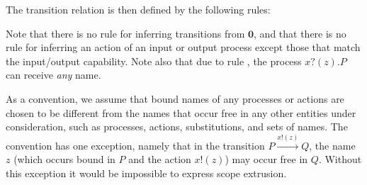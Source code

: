\documentclass[a4paper]{article}
\newcommand{\Pend}{\bm{0}}
\newcommand{\Ppar}[2]{#1 \mid #2}
\newcommand{\Pres}[2]{(\bm{\nu} #1)~#2}
\newcommand{\Pout}[3]{#1 ! #2 . #3}
\newcommand{\Pin}[3]{#1 ? (#2) . #3}
\newcommand{\Pchoice}[2]{#1 + #2}
\newcommand{\freenames}[1]{\textrm{fn}(#1)}
\newcommand{\boundnames}[1]{\textrm{bn}(#1)}
\newcommand{\names}[1]{\textrm{n}(#1)}
\newcommand{\subst}[3]{#1\{#2/#3\}}
\newcommand{\Aoutf}[2]{#1 ! #2}
\newcommand{\Aoutb}[2]{#1 ! (#2)}
\newcommand{\Ain}[2]{#1 ? #2}
\newcommand{\Atau}{\tau}
\newcommand{\transition}[3]{#1 \xrightarrow{#2} #3}
\begin{document}
The transition relation is then defined by the following rules:
Note that there is no rule for inferring transitions from \( \Pend \), and that there is no rule for inferring an action of an input or output process except those that match the input/output capability.
Note also that due to rule , the process \( \Pin{x}{z}{P} \) can receive \emph{any} name.

As a convention, we assume that bound names of any processes or actions are chosen to be different from the names that occur free in any other entities under consideration, such as processes, actions, substitutions, and sets of names.
The convention has one exception, namely that in the transition \( \transition{P}{\Aoutb{x}{z}}{Q} \), the name \( z \) (which occurs bound in \( P \) and the action \( \Aoutb{x}{z} \)) may occur free in \( Q \).
Without this exception it would be impossible to express scope extrusion.
\end{document}
